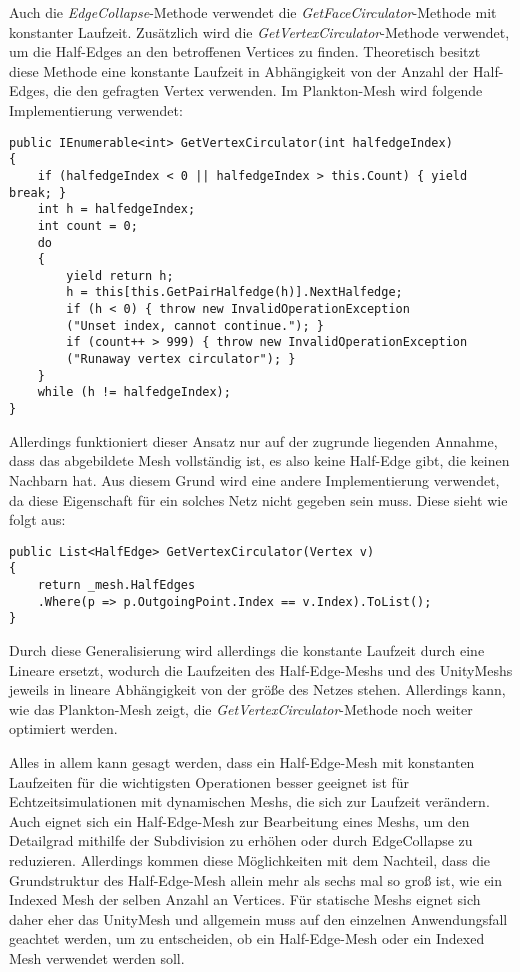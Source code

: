 Auch die \textit{EdgeCollapse}-Methode verwendet die \textit{GetFaceCirculator}-Methode mit konstanter Laufzeit. Zus\"atzlich wird die \textit{GetVertexCirculator}-Methode verwendet, um die Half-Edges an den betroffenen Vertices zu finden. Theoretisch besitzt diese Methode eine konstante Laufzeit in Abh\"angigkeit von der Anzahl der Half-Edges, die den gefragten Vertex verwenden. Im Plankton-Mesh \cite{meshMash} wird folgende Implementierung verwendet:
\begin{lstlisting}
public IEnumerable<int> GetVertexCirculator(int halfedgeIndex)
{
	if (halfedgeIndex < 0 || halfedgeIndex > this.Count) { yield break; }
	int h = halfedgeIndex;
	int count = 0;
	do
	{
		yield return h;
		h = this[this.GetPairHalfedge(h)].NextHalfedge;
		if (h < 0) { throw new InvalidOperationException
		("Unset index, cannot continue."); }
		if (count++ > 999) { throw new InvalidOperationException
		("Runaway vertex circulator"); }
	}
	while (h != halfedgeIndex);
}
\end{lstlisting}
Allerdings funktioniert dieser Ansatz nur auf der zugrunde liegenden Annahme, dass das abgebildete Mesh vollst\"andig ist, es also keine Half-Edge gibt, die keinen Nachbarn hat. Aus diesem Grund wird eine andere Implementierung verwendet, da diese Eigenschaft f\"ur ein solches Netz nicht gegeben sein muss. Diese sieht wie folgt aus: 
\begin{lstlisting}
public List<HalfEdge> GetVertexCirculator(Vertex v)
{
	return _mesh.HalfEdges
	.Where(p => p.OutgoingPoint.Index == v.Index).ToList();
}
\end{lstlisting}
Durch diese Generalisierung wird allerdings die konstante Laufzeit durch eine Lineare ersetzt, wodurch die Laufzeiten des Half-Edge-Meshs und des UnityMeshs jeweils in lineare Abh\"angigkeit von der gr\"o{\ss}e des Netzes stehen. Allerdings kann, wie das Plankton-Mesh zeigt, die \textit{GetVertexCirculator}-Methode noch weiter optimiert werden. 

Alles in allem kann gesagt werden, dass ein Half-Edge-Mesh mit konstanten Laufzeiten f\"ur die wichtigsten Operationen besser geeignet ist f\"ur Echtzeitsimulationen mit dynamischen Meshs, die sich zur Laufzeit ver\"andern. Auch eignet sich ein Half-Edge-Mesh zur Bearbeitung eines Meshs, um den Detailgrad mithilfe der Subdivision zu erh\"ohen oder durch EdgeCollapse zu reduzieren. Allerdings kommen diese M\"oglichkeiten mit dem Nachteil, dass die Grundstruktur des Half-Edge-Mesh allein mehr als sechs mal so gro{\ss} ist, wie ein Indexed Mesh der selben Anzahl an Vertices. F\"ur statische Meshs eignet sich daher eher das UnityMesh und allgemein muss auf den einzelnen Anwendungsfall geachtet werden, um zu entscheiden, ob ein Half-Edge-Mesh oder ein Indexed Mesh verwendet werden soll.

